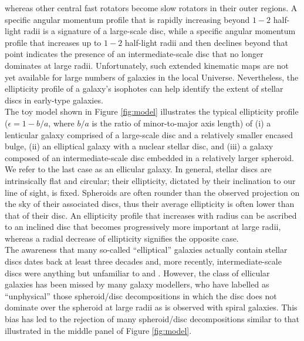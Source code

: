 \documentclass[useAMS,usenatbib,article]{mn2e}
\begin{document}
whereas other central fast rotators become slow rotators in their outer regions.
A specific angular momentum profile that is rapidly increasing beyond $1-2$ half-light radii 
is a signature of a large-scale disc, 
while a specific angular momentum profile that increases up to $1-2$ half-light radii and then declines beyond that point 
indicates the presence of an intermediate-scale disc that no longer dominates at large radii. 
Unfortunately, such extended kinematic maps are not yet available for large numbers of galaxies in the local Universe. 
Nevertheless, the ellipticity profile of a galaxy's isophotes can help identify the extent of stellar discs in early-type galaxies. \\
The toy model shown in Figure \ref{fig:model} illustrates the typical ellipticity profile 
($\epsilon = 1 - b/a$, where $b/a$ is the ratio of minor-to-major axis length) of 
(i) a lenticular galaxy comprised of a large-scale disc and a relatively smaller encased bulge, 
(ii) an elliptical galaxy with a nuclear stellar disc, 
and (iii) a galaxy composed of an intermediate-scale disc embedded in a relatively larger spheroid. 
We refer to the last case as an ellicular galaxy. 
In general, stellar discs are intrinsically flat and circular; 
their ellipticity, dictated by their inclination to our line of sight, is fixed. 
Spheroids are often rounder than the observed projection on the sky of their associated discs, 
thus their average ellipticity is often lower than that of their disc. 
An ellipticity profile that increases with radius can be ascribed to an inclined disc that becomes progressively more important at large radii, 
whereas a radial decrease of ellipticity signifies the opposite case. \\
The awareness that many so-called ``elliptical'' galaxies actually contain stellar discs 
dates back at least three decades 
\citep{capaccioli1987,carter1987,rixwhite1990,bender1990,scorzabender1990,nieto1991,rixwhite1992,scorzabender1995,
donofrio1995,graham1998fornax,scorza1998,scorzavandenbosch1998} and, 
more recently, intermediate-scale discs were anything but unfamiliar to \cite{kormendybender2012} and \cite{krajnovic2013etal}. 
However, the class of ellicular galaxies has been missed by many galaxy modellers, 
who have labelled as ``unphysical'' \citep{allen2006} those spheroid/disc decompositions in which the disc does not dominate over the spheroid at large radii 
as is observed with spiral galaxies. 
This bias has led to the rejection of many spheroid/disc decompositions similar to that illustrated in the middle panel of Figure \ref{fig:model}. 
\end{document}
